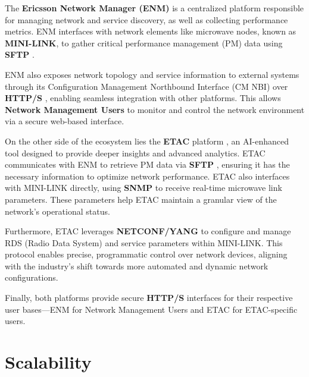 \documentclass[11pt,sigconf]{iabart}
\begin{document}
The \textbf{Ericsson Network Manager (ENM)} is a centralized platform responsible for managing network and service discovery, as well as collecting performance metrics. ENM interfaces with network elements like microwave nodes, known as \textbf{MINI-LINK}, to gather critical performance management (PM) data using \textbf{SFTP} \cite{RFC4253}.

ENM also exposes network topology and service information to external systems through its Configuration Management Northbound Interface (CM NBI) over \textbf{HTTP/S} \cite{RFC7230}, enabling seamless integration with other platforms. This allows \textbf{Network Management Users} to monitor and control the network environment via a secure web-based interface.

On the other side of the ecosystem lies the \textbf{ETAC} platform \cite{ericsson-etac}, an AI-enhanced tool designed to provide deeper insights and advanced analytics. ETAC communicates with ENM to retrieve PM data via \textbf{SFTP} \cite{RFC4253}, ensuring it has the necessary information to optimize network performance. ETAC also interfaces with MINI-LINK directly, using \textbf{SNMP} \cite{RFC1157} to receive real-time microwave link parameters. These parameters help ETAC maintain a granular view of the network's operational status.

Furthermore, ETAC leverages \textbf{NETCONF/YANG} \cite{RFC6241, rfc6020} to configure and manage RDS (Radio Data System) and service parameters within MINI-LINK. This protocol enables precise, programmatic control over network devices, aligning with the industry's shift towards more automated and dynamic network configurations.

Finally, both platforms provide secure \textbf{HTTP/S} \cite{RFC7230} interfaces for their respective user bases—ENM for Network Management Users and ETAC for ETAC-specific users. 


\section{Scalability} \label{scalability}

 
\end{document}
